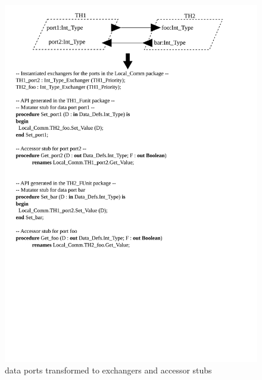 \begin{figure}
\centering
\includegraphics[scale=0.5]{figs/dataports}
\caption{\aadl data ports transformed to exchangers and accessor stubs}
\label{fig:dataports}
\end{figure}

